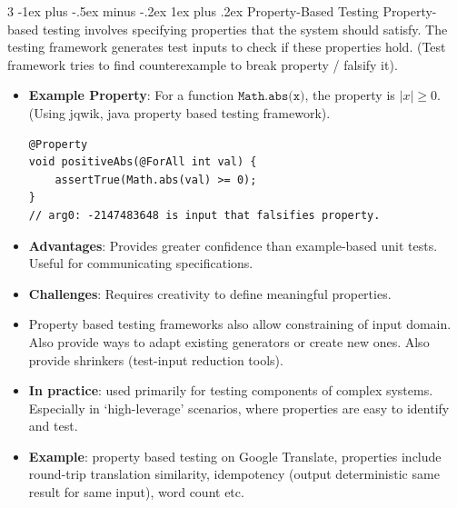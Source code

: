 \documentclass[a4paper, 10pt, landscape]{article}
\makeatletter
\renewcommand{\subsubsection}{\@startsection{subsubsection}{3}{0mm}%
                                {-1ex plus -.5ex minus -.2ex}%
                                {1ex plus .2ex}%
                                {\normalfont\small\bfseries}}
\makeatother
\begin{document}
\begin{multicols*}{3}
\subsubsection{Property-Based Testing}
Property-based testing involves specifying properties that the system should satisfy. The testing framework generates test inputs to check if these properties hold. (Test framework tries to find counterexample to break property / falsify it).

\begin{itemize}
\item \textbf{Example Property}: For a function $ \texttt{Math.abs(x)} $, the property is $ |x| \geq 0 $. (Using jqwik, java property based testing framework).
\begin{verbatim}
@Property
void positiveAbs(@ForAll int val) {
    assertTrue(Math.abs(val) >= 0);
}
// arg0: -2147483648 is input that falsifies property.
\end{verbatim}
\item \textbf{Advantages}: Provides greater confidence than example-based unit tests. Useful for communicating specifications.
\item \textbf{Challenges}: Requires creativity to define meaningful properties.
\item Property based testing frameworks also allow constraining of input domain. Also provide ways to adapt existing generators or create new ones. Also provide shrinkers (test-input reduction tools).
\item \textbf{In practice}: used primarily for testing components of complex systems.  Especially in `high-leverage'
scenarios, where properties are easy to identify and test. 
\item \textbf{Example}: property based testing on Google Translate, properties include round-trip translation similarity, idempotency (output deterministic same result for same input), word count etc.
\end{itemize}


\end{multicols*}
\end{document}

